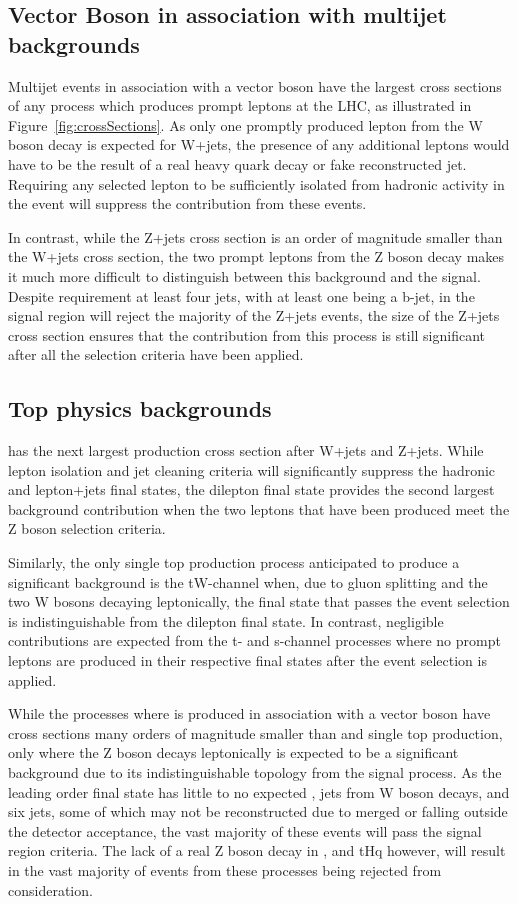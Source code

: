 \subsection{Vector Boson in association with multijet backgrounds}
Multijet events in association with a vector boson have the largest cross sections of any process which produces prompt leptons at the LHC, as illustrated in Figure~\ref{fig:crossSections}.
As only one promptly produced lepton from the W boson decay is expected for W+jets, the presence of any additional leptons would have to be the result of a real heavy quark decay or fake reconstructed jet. 
Requiring any selected lepton to be sufficiently isolated from hadronic activity in the event will suppress the contribution from these events.

In contrast, while the Z+jets cross section is an order of magnitude smaller than the W+jets cross section, the two prompt leptons from the Z boson decay makes it much more difficult to distinguish between this background and the signal.
Despite requirement at least four jets, with at least one being a b-jet, in the signal region will reject the majority of the Z+jets events, the size of the Z+jets cross section ensures that the contribution from this process is still significant after all the selection criteria have been applied.

\subsection{Top physics backgrounds}
\ttbar has the next largest production cross section after W+jets and Z+jets.
While lepton isolation and jet cleaning criteria will significantly suppress the hadronic and lepton+jets final states, the dilepton final state provides the second largest background contribution when the two leptons that have been produced meet the Z boson selection criteria.

Similarly, the only single top production process anticipated to produce a significant background is the tW-channel when, due to gluon splitting and the two W bosons decaying leptonically, the final state that passes the event selection is indistinguishable from the \ttbar dilepton final state.
In contrast, negligible contributions are expected from the t- and s-channel processes
where no prompt leptons are produced in their respective final states after the event selection is applied.

While the processes where \ttbar is produced in association with a vector boson have cross sections many orders of magnitude smaller than \ttbar and single top production, only \ttbarZ where the Z boson decays leptonically is expected to be a significant background due to its indistinguishable topology from the signal process.
As the leading order final state has little to no expected \MET, jets from W boson decays, and six jets,
some of which may not be reconstructed due to merged or falling outside the detector acceptance, the vast majority of these events will pass the signal region criteria.
The lack of a real Z boson decay in \ttbarW, \ttbarH and tHq however, will result in the vast majority of events from these processes being rejected from consideration.

